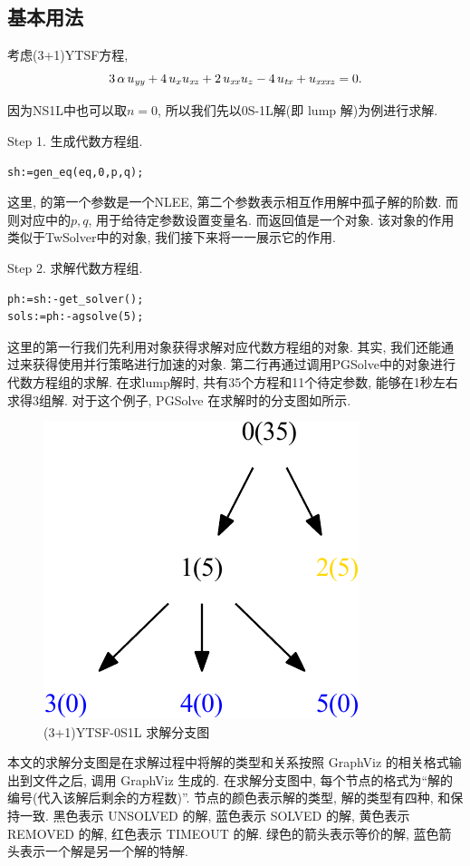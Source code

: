 \subsection{基本用法}
考虑(3+1)YTSF方程\CITEcaYTSF,
\begin{equation}
    3\,\alpha\,u_{{{\it yy}}}+4\,u_{{x}}u_{{{\it xz}}}+2\,u_{{{\it xx}}}u_{{z}}-4\,u_{{{\it tx}}}+u_{{{\it xxxz}}}=0. 
\end{equation}

因为NS1L中也可以取$n=0$, 所以我们先以0S-1L解(即 lump 解)为例进行求解. 

Step 1. 生成代数方程组.
\begin{verbatim}
sh:=gen_eq(eq,0,p,q);
\end{verbatim}
这里,  的第一个参数是一个NLEE, 第二个参数表示相互作用解中孤子解的阶数. 而则对应中的$p,q$, 用于给待定参数设置变量名. 而返回值是一个对象. 该对象的作用类似于TwSolver中的对象, 我们接下来将一一展示它的作用. 

Step 2. 求解代数方程组.
\begin{verbatim}
ph:=sh:-get_solver();
sols:=ph:-agsolve(5);
\end{verbatim}
这里的第一行我们先利用对象获得求解对应代数方程组的对象. 其实, 我们还能通过来获得使用并行策略进行加速的对象. 第二行再通过调用PGSolve中的对象进行代数方程组的求解. 在求lump解时, 共有35个方程和11个待定参数, 能够在1秒左右求得3组解. 对于这个例子, PGSolve 在求解时的分支图如所示. 

\begin{figure}[htbp]
\centering
\includegraphics[width=.3\textwidth]{fig/0S1L.pdf}
\caption{(3+1)YTSF-0S1L 求解分支图}\label{sb0}
\end{figure}

本文的求解分支图是在求解过程中将解的类型和关系按照 GraphViz\cite{ellson2001graphviz} 的相关格式输出到文件之后, 调用 GraphViz 生成的. 在求解分支图中, 每个节点的格式为``解的编号(代入该解后剩余的方程数)''. 节点的颜色表示解的类型, 解的类型有四种, 和保持一致. 黑色表示 UNSOLVED 的解, 蓝色表示 SOLVED 的解, 黄色表示 REMOVED 的解, 红色表示 TIMEOUT 的解. 绿色的箭头表示等价的解, 蓝色箭头表示一个解是另一个解的特解.

